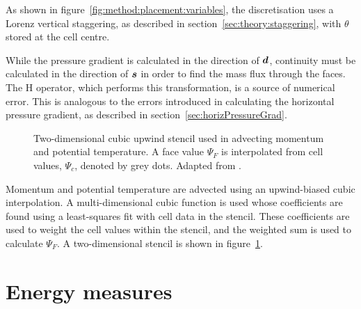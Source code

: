 As shown in figure~\ref{fig:method:placement:variables}, the discretisation uses a Lorenz vertical staggering, as described in section~\ref{sec:theory:staggering}, with $\theta$ stored at the cell centre.

While the pressure gradient is calculated in the direction of $\bm{d}$, continuity must be calculated in the direction of $\bm{s}$ in order to find the mass flux through the faces.  The H operator, which performs this transformation, is a source of numerical error.  This is analogous to the errors introduced in calculating the horizontal pressure gradient, as described in section~\ref{sec:horizPressureGrad}.

\begin{figure}
\centering

\caption{Two-dimensional cubic upwind stencil used in advecting momentum and potential temperature.  A face value $\Psi_F$ is interpolated from cell values, $\Psi_c$, denoted by grey dots.  Adapted from \textcite{weller-shahrokhi2014}.}
\label{fig:method:cubicUpwind}
\end{figure}

Momentum and potential temperature are advected using an upwind-biased cubic interpolation.  A multi-dimensional cubic function is used whose coefficients are found using a least-squares fit with cell data in the stencil.  These coefficients are used to weight the cell values within the stencil, and the weighted sum is used to calculate $\Psi_F$.  A two-dimensional stencil is shown in figure~\ref{fig:method:cubicUpwind}.

\section{Energy measures}
\label{sec:method:energy}

